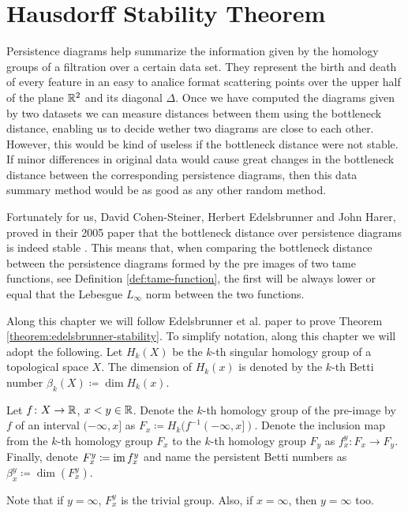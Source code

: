\chapter{Hausdorff Stability Theorem}

Persistence diagrams help summarize the information given by the homology groups of a filtration over a certain data set. They represent the birth and death of every feature in an easy to analice format scattering points over the upper half of the plane $\mathbb R^2 $ and its diagonal $ \Delta $. Once we have computed the diagrams given by two datasets we can measure distances between them using the bottleneck distance, enabling us to decide wether two diagrams are close to each other. However, this would be kind of useless if the bottleneck distance were not stable. If minor differences in original data would cause great changes in the bottleneck distance between the corresponding persistence diagrams, then this data summary method would be as good as any other random method.

Fortunately for us, David Cohen-Steiner, Herbert Edelsbrunner and John Harer, proved in their 2005 paper that the bottleneck distance over persistence diagrams is indeed stable \cite{Edelsbrunner}. This means that, when comparing the bottleneck distance between the persistence diagrams formed by the pre images of two tame functions, see Definition \ref{def:tame-function}, the first will be always lower or equal that the Lebesgue $L_\infty$ norm between the two functions.

Along this chapter we will follow Edelsbrunner et al. paper \cite{Edelsbrunner} to prove Theorem \ref{theorem:edelsbrunner-stability}. To simplify notation, along this chapter we will adopt the following. Let $ H_k(X) $ be the $k$-th singular homology group of a topological space $ X $. The dimension of $ H_k(x) $ is denoted by the $k$-th Betti number $ \beta_k(X) \coloneq \dim H_k(x) $.

Let $ f\colon X \to \mathbb R $, $x < y \in \mathbb R$. Denote the $k$-th homology group of the pre-image by $ f $ of an interval $ (-\infty, x] $ as $ F_x \coloneq H_k(f^{-1}(-\infty, x])$. Denote the inclusion map from the $k$-th homology group $ F_x$ to the  $k$-th homology group $ F_y$ as $f_x^y \colon F_x \to F_y $. Finally, denote $ F_x^y \coloneq \operatorname{im} f_x^y $ and name the persistent Betti numbers as $ \beta_x^y \coloneq \dim(F_x^y) $.

Note that if $ y = \infty $, $ F_x^y $ is the trivial group. Also, if $ x = \infty $, then $ y = \infty $ too. 

